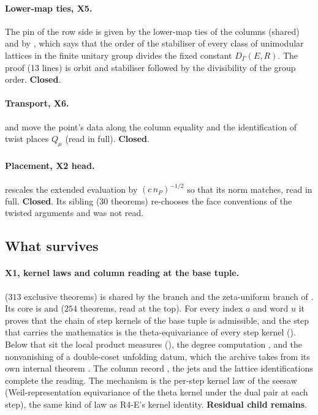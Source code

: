 \documentclass[11pt]{article}
\newcommand{\sC}{\textbf{Closed}}
\newcommand{\sR}{\textbf{Residual child remains}}
\theoremstyle{remark}
\begin{document}
\paragraph{Lower-map ties, X5.} The pin of the row side is given by the lower-map ties of the columns (shared) and by , which says that the order of the stabiliser of every class of unimodular lattices in the finite unitary group divides the fixed constant $D_\Gamma(E,R)$. The proof (13 lines) is orbit and stabiliser followed by the divisibility of the group order. \sC.

\paragraph{Transport, X6.}  and  move the point's data along the column equality and the identification of twist places $Q_\mu$ (read in full). \sC.

\paragraph{Placement, X2 head.}  rescales the extended evaluation by $(c\,n_P)^{-1/2}$ so that its norm matches, read in full. \sC. Its sibling  ($30$ theorems) re-chooses the face conventions of the twisted arguments and was not read.

\subsection{What survives}

\paragraph{X1, kernel laws and column reading at the base tuple.}  ($313$ exclusive theorems) is shared by the  branch and the zeta-uniform branch of . Its core is  and  ($254$ theorems, read at the top). For every index $a$ and word $u$ it proves that the chain of step kernels of the base tuple is admissible, and the step that carries the mathematics is the theta-equivariance  of every step kernel (). Below that sit the local product measures (), the degree computation , and the nonvanishing of a double-coset unfolding datum, which the archive takes from its own internal theorem . The column record , the jets  and the lattice identifications  complete the reading. The mechanism is the per-step kernel law of the seesaw (Weil-representation equivariance of the theta kernel under the dual pair at each step), the same kind of law as R4-E's kernel identity. \sR.
\end{document}
